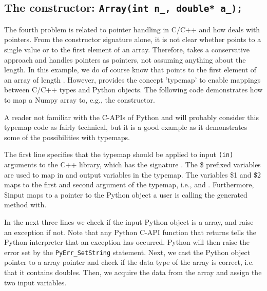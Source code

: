 \begin{code}
\subsection{The constructor: \texttt{Array(int n\_, double* a\_);}}
The fourth problem is related to pointer handling in C/C++ and how \swig deals with pointers.  From the constructor signature alone, it is not clear whether  points to a single value or to the first element of an array. 
Therefore, \swig takes a conservative approach and handles pointers as pointers, not assuming anything about the length. 
In this example, we do of course know that 
 points to the first element of an array of length .  
However, \swig provides the concept 'typemap' to enable mappings between C/C++ types and Python objects. 
The following code demonstrates how to map a Numpy array
to, e.g., the  constructor. 
A reader not familiar with the C-APIs of Python and \numpy will probably consider this typemap code as fairly technical, but it is a good example as it demonstrates some of the possibilities with typemaps. \par
The first line specifies that the typemap should be applied to input \texttt{(in)} arguments to the C++ library, which has the signature . The \$ prefixed variables are used to map in and output variables in the typemap. The variables \$1 and \$2 maps to the first and second argument of the typemap, i.e.,  and . Furthermore, \$input maps to a pointer to the Python object a user is calling the \swig generated method with. \par
In the next three lines we check if the input Python object is a \numpy array, and raise an exception if not. 
Note that any Python C-API function that returns  tells the Python interpreter that an exception has occurred. Python will then raise the error set by the \texttt{PyErr\_SetString} statement. Next, we cast the Python object pointer to a \numpy array pointer and check if the data type of the \numpy array is correct, i.e. that it contains doubles. Then, we acquire the data from the \numpy array and assign the two input variables.\par


\end{code}
